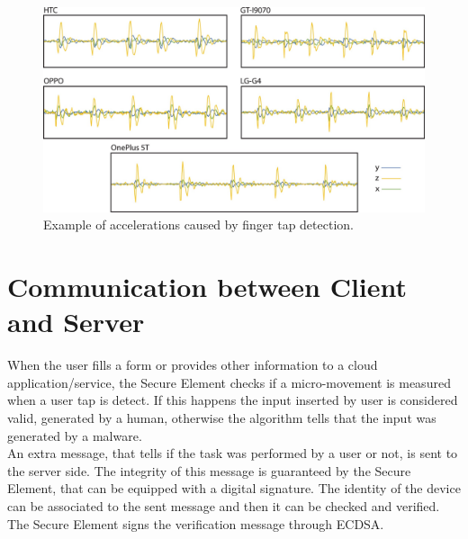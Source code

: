 \begin{figure}[h]
     \centering
     \includegraphics[width=.8\linewidth]{Images/InvisibleCAPPCHA/tap}
     \caption{\footnotesize{Example of accelerations caused by finger tap detection.}}\label{inv:tap}
\end{figure}


\section{Communication between Client and Server}
When the user fills a form or provides other information to a cloud application/service, the Secure Element checks if a micro-movement is measured when a user tap is detect. If this happens the input inserted by user is considered valid, generated by a human, otherwise the algorithm tells that the input was generated by a malware.\\
An extra message, that tells if the task was performed by a user or not, is sent to the server side. The integrity of this message is guaranteed by the Secure Element, that can be equipped with a digital signature. The identity of the device can be associated to the sent message and then it can be checked and verified. The Secure Element signs the verification message through ECDSA.

